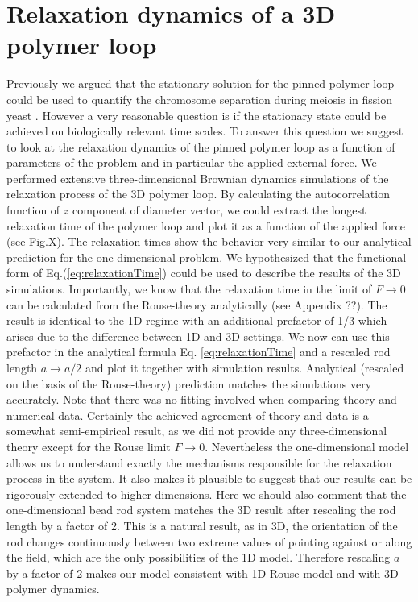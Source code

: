 \documentclass[aps,showpacs,twocolumn,floatfix,prx,superscriptaddress]{revtex4-1}
\begin{document}
\section{Relaxation dynamics of a 3D polymer loop}
Previously we argued that the stationary solution for the pinned polymer loop could be used to quantify the chromosome separation during meiosis in fission yeast \cite{Lin2015}. However a very reasonable question is if the stationary state could be achieved on biologically relevant time scales. To answer this question we suggest to look at the relaxation dynamics of the pinned polymer loop as a function of parameters of the problem and in particular the applied external force. We performed extensive three-dimensional Brownian dynamics simulations of the relaxation process of the 3D polymer loop. By calculating the autocorrelation function of $z$ component of diameter vector, we could extract the longest relaxation time of the polymer loop and plot it as a function of the applied force (see Fig.X). The relaxation times show the behavior very similar to our analytical prediction for the one-dimensional problem. We hypothesized that the functional form of Eq.(\ref{eq:relaxationTime}) could be used to describe the results of the 3D simulations. Importantly, we know that the relaxation time in the limit of $F\rightarrow 0$ can be calculated from the Rouse-theory analytically (see Appendix ??).  The result is identical to the 1D regime with an additional prefactor of 1/3 which arises due to the difference between 1D and 3D settings. We now can use this prefactor in the analytical formula Eq. \eqref{eq:relaxationTime} and a rescaled rod length $a\rightarrow a/2$ and plot it together with simulation results. Analytical (rescaled on the basis of the Rouse-theory) prediction matches the simulations very accurately. Note that there was no fitting involved when comparing theory and numerical data. Certainly the achieved agreement of theory and data is a somewhat semi-empirical result, as we did not provide any three-dimensional theory except for the Rouse limit $F\rightarrow 0$. Nevertheless the one-dimensional model allows us to understand exactly the mechanisms responsible for the relaxation process in the system. It also makes it plausible to suggest that our results can be rigorously extended to higher dimensions. Here we should also comment that the one-dimensional bead rod system matches the 3D result after rescaling the rod length by a factor of 2. This is a natural result, as in 3D, the orientation of the rod changes continuously between two extreme values of pointing against or along the field, which are the only possibilities of the 1D model. Therefore rescaling $a$ by a factor of 2 makes our model consistent with 1D Rouse model and with 3D polymer dynamics.
 
\end{document}
